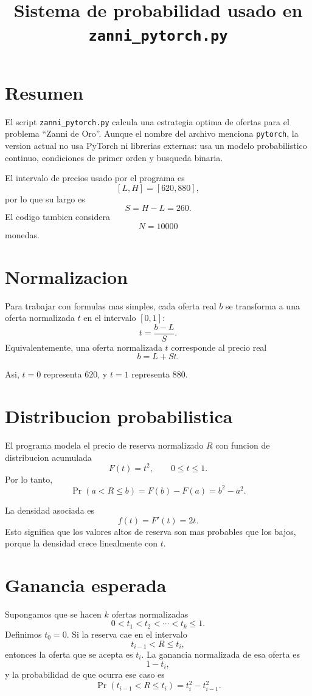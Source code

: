\documentclass[11pt]{article}
\title{Sistema de probabilidad usado en \texttt{zanni\_pytorch.py}}
\author{}
\date{}
\begin{document}
\maketitle

\section{Resumen}

El script \texttt{zanni\_pytorch.py} calcula una estrategia optima de ofertas
para el problema ``Zanni de Oro''. Aunque el nombre del archivo menciona
\texttt{pytorch}, la version actual no usa PyTorch ni librerias externas: usa un
modelo probabilistico continuo, condiciones de primer orden y busqueda binaria.

El intervalo de precios usado por el programa es
\[
  [L,H] = [620,880],
\]
por lo que su largo es
\[
  S = H-L = 260.
\]
El codigo tambien considera
\[
  N = 10000
\]
monedas.

\section{Normalizacion}

Para trabajar con formulas mas simples, cada oferta real \(b\) se transforma a
una oferta normalizada \(t\) en el intervalo \([0,1]\):
\[
  t = \frac{b-L}{S}.
\]
Equivalentemente, una oferta normalizada \(t\) corresponde al precio real
\[
  b = L + S t.
\]

Asi, \(t=0\) representa \(620\), y \(t=1\) representa \(880\).

\section{Distribucion probabilistica}

El programa modela el precio de reserva normalizado \(R\) con funcion de
distribucion acumulada
\[
  F(t) = t^2, \qquad 0 \le t \le 1.
\]
Por lo tanto,
\[
  \Pr(a < R \le b) = F(b)-F(a) = b^2-a^2.
\]

La densidad asociada es
\[
  f(t) = F'(t) = 2t.
\]
Esto significa que los valores altos de reserva son mas probables que los bajos,
porque la densidad crece linealmente con \(t\).

\section{Ganancia esperada}

Supongamos que se hacen \(k\) ofertas normalizadas
\[
  0 < t_1 < t_2 < \cdots < t_k \le 1.
\]
Definimos \(t_0=0\). Si la reserva cae en el intervalo
\[
  t_{i-1} < R \le t_i,
\]
entonces la oferta que se acepta es \(t_i\). La ganancia normalizada de esa
oferta es
\[
  1-t_i,
\]
y la probabilidad de que ocurra ese caso es
\[
  \Pr(t_{i-1}<R\le t_i)=t_i^2-t_{i-1}^2.
\]
\end{document}
